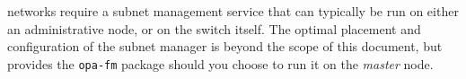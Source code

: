 \begin{center}
  \begin{tcolorbox}[]
\OmniPath{} networks require a subnet management service that can typically be
run on either an administrative node, or on the switch itself. The optimal
placement and configuration of the subnet manager is beyond the scope of this
document, but \baseOS{} provides the \texttt{opa-fm} package should you choose
to run it on the {\em master} node.
\end{tcolorbox}
\end{center}

